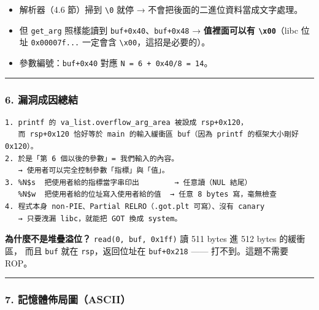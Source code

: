 \documentclass[10pt,a4paper]{article}
\providecommand{\tightlist}{%
  \setlength{\itemsep}{0pt}\setlength{\parskip}{0pt}}
\begin{document}
\begin{itemize}
\tightlist
\item
  解析器（4.6 節）掃到 \texttt{\textbackslash{}\allowbreak{}0} 就停 →
  不會把後面的二進位資料當成文字處理。
\item
  但 \texttt{get\_\allowbreak{}arg} 照樣能讀到 \texttt{buf+0x40}、\texttt{buf+0x48} →
  \textbf{值裡面可以有 \texttt{\textbackslash{}\allowbreak{}x00}}（libc 位址
  \texttt{0x00007f...} 一定會含
  \texttt{\textbackslash{}\allowbreak{}x00}，這招是必要的）。
\item
  參數編號：\texttt{buf+0x40} 對應 \texttt{N\ \allowbreak{}=\ \allowbreak{}6\ \allowbreak{}+\ \allowbreak{}0x40/\allowbreak{}8\ \allowbreak{}=\ \allowbreak{}14}。
\end{itemize}

\begin{center}\rule{0.5\linewidth}{0.5pt}\end{center}

\subsubsection{6.
漏洞成因總結}\label{ux6f0fux6d1eux6210ux56e0ux7e3dux7d50}

\begin{Verbatim}[breaklines=true,breakanywhere=true,breakautoindent=false,fontsize=\fontsize{7.0}{9.5}\selectfont]
1. printf 的 va_list.overflow_arg_area 被設成 rsp+0x120，
   而 rsp+0x120 恰好等於 main 的輸入緩衝區 buf（因為 printf 的框架大小剛好 0x120）。
2. 於是「第 6 個以後的參數」= 我們輸入的內容。
   → 使用者可以完全控制參數「指標」與「值」。
3. %N$s  把使用者給的指標當字串印出        → 任意讀（NUL 結尾）
   %N$w  把使用者給的位址寫入使用者給的值  → 任意 8 bytes 寫，毫無檢查
4. 程式本身 non-PIE、Partial RELRO（.got.plt 可寫）、沒有 canary
   → 只要洩漏 libc，就能把 GOT 換成 system。
\end{Verbatim}

\textbf{為什麼不是堆疊溢位？} \texttt{read(0,\allowbreak{}\ \allowbreak{}buf,\allowbreak{}\ \allowbreak{}0x1ff)} 讀 511
bytes 進 512 bytes 的緩衝區， 而且 \texttt{buf} 就在
\texttt{rsp}，返回位址在 \texttt{buf+0x218} ------ 打不到。這題不需要
ROP。

\begin{center}\rule{0.5\linewidth}{0.5pt}\end{center}

\subsubsection{7.
記憶體佈局圖（ASCII）}\label{ux8a18ux61b6ux9ad4ux4f48ux5c40ux5716ascii}
\end{document}
